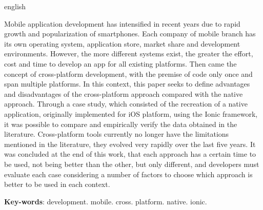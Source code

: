 \begin{resumo}[Abstract]
 \begin{otherlanguage*}{english}
  
  \begin{comment}
  O desenvolvimento de aplicativos móveis intensificou-se nos últimos anos devido ao crescimento acelerado e popularização dos \textit{smartphones}. Cada empresa
  do ramo móvel possui seu próprio sistema operacional, loja de aplicativos, parcela de mercado e ambientes de desenvolvimento. No entanto, quanto mais 
  sistemas diferentes existem, maior o esforço, custo e tempo para desenvolver um \textit{app} para todas as plataformas existentes. Surgiu então, o conceito de desenvolvimento multiplataformas,
  com a premissa de codificar apenas uma vez e abranger várias plataformas. Neste contexto, o presente trabalho busca definir vantagens e desvantagens da abordagem
  multiplataformas quando comparada com a abordagem nativa. Por meio de um estudo de caso, que consistiu na recriação de um aplicativo nativo, implementado originalmente para a plataforma iOS,
  utilizando o \textit{framework} Ionic, foi possível comparar e comprovar empiricamente os dados obtidos na literatura. As ferramentas multiplataformas, atualmente,
  não possuem mais as limitações apontadas pela literatura, pois evoluíram muito rapidamente ao longo dos últimos cinco anos. Concluiu-se, ao fim desse trabalho, que cada abordagem tem um momento certo
  para ser utilizada, não sendo uma melhor que a outra, mas apenas diferentes entre si, e deve-se avaliar cada caso, considerando-se uma série de fatores para escolher qual abordagem utilizar.
  \end{comment}

  Mobile application development has intensified in recent years due to rapid growth and popularization of smartphones. Each company of 
  mobile branch has its own operating system, application store, market share and development environments. 
  However, the more different systems exist, the greater the effort, cost and time to develop an app for all existing platforms. Then came the concept of cross-platform development, 
  with the premise of code only once and span multiple platforms. In this context, this paper seeks to define advantages and disadvantages of the cross-platform approach 
  compared with the native approach. Through a case study, which consisted of the recreation of a native application, originally implemented for iOS platform, 
  using the Ionic framework, it was possible to compare and empirically verify the data obtained in the literature. Cross-platform tools currently 
  no longer have the limitations mentioned in the literature, they evolved very rapidly over the last five years. It was concluded at the end of this work, that each approach has a certain time 
  to be used, not being better than the other, but only different, and developers must evaluate each case considering a number of factors to choose which approach is better to be used in each context.

  \vspace{\onelineskip}

  \noindent 
  \textbf{Key-words}: development. mobile. cross. platform. native. ionic.
 \end{otherlanguage*}
\end{resumo}
